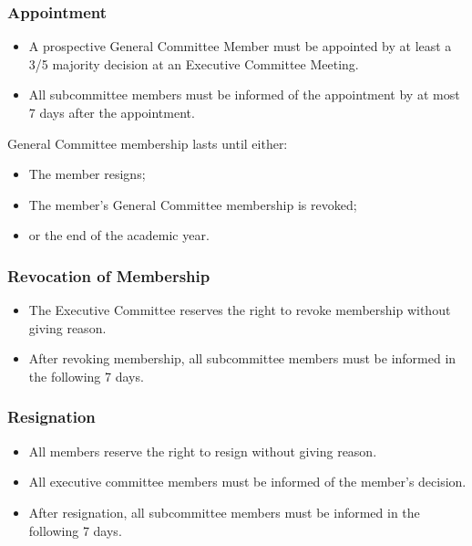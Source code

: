 \documentclass{article}
\begin{document}
            \subsubsection{Appointment}
                \begin{itemize}
                    \item A prospective General Committee Member must be appointed by at least a 3/5 majority decision at an Executive Committee Meeting.
                    \item All subcommittee members must be informed of the appointment by at most 7 days after the appointment.
                \end{itemize}
            General Committee membership lasts until either:
            \begin{itemize}
                \item The member resigns;
                \item The member’s General Committee membership is revoked;
                \item or the end of the academic year.
            \end{itemize}
            \subsubsection{Revocation of Membership}
                \begin{itemize}
                    \item The Executive Committee reserves the right to revoke membership without giving reason.
                    \item After revoking membership, all subcommittee members must be informed in the following 7 days.
                \end{itemize}

            \subsubsection{Resignation}
                \begin{itemize}
                    \item All members reserve the right to resign without giving reason.
                    \item All executive committee members must be informed of the member’s decision.
                    \item After resignation, all subcommittee members must be informed in the following 7 days.
                \end{itemize}
\end{document}

